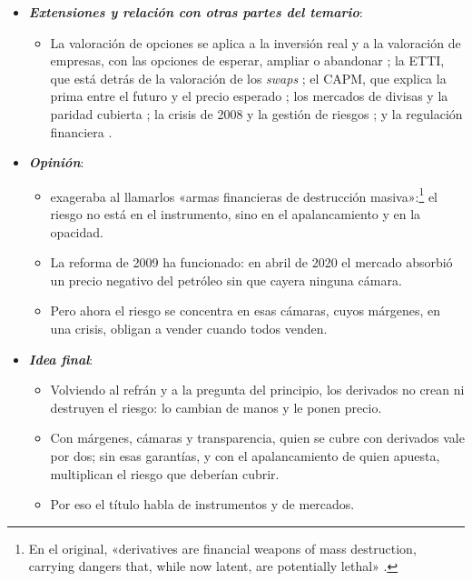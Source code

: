 \documentclass[11pt]{article}
\begin{document}
\begin{itemize}
\begin{itemize}
  \end{itemize}
\item \textbf{\emph{Extensiones y relación con otras partes del temario}}:
  \begin{itemize}
  \item La valoración de opciones se aplica a la inversión real y a la valoración de empresas, con las opciones de esperar, ampliar o abandonar   ; la ETTI, que está detrás de la valoración de los \emph{swaps} ; el CAPM, que explica la prima entre el futuro y el precio esperado ; los mercados de divisas y la paridad cubierta ; la crisis de 2008 y la gestión de riesgos ; y la regulación financiera .
  \end{itemize}
\item \textbf{\emph{Opinión}}:
  \begin{itemize}
  \item {} exageraba al llamarlos «armas financieras de destrucción masiva»:\footnote{En el original, «derivatives are financial weapons of mass destruction, carrying dangers that, while now latent, are potentially lethal» \parencite[15]{Buffett2003Carta}.} el riesgo no está en el instrumento, sino en el apalancamiento y en la opacidad.

  \item La reforma de 2009 ha funcionado: en abril de 2020 el mercado absorbió un precio negativo del petróleo sin que cayera ninguna cámara.

  \item Pero ahora el riesgo se concentra en esas cámaras, cuyos márgenes, en una crisis, obligan a vender cuando todos venden.
  \end{itemize}
\item \textbf{\emph{Idea final}}:
  \begin{itemize}
  \item Volviendo al refrán y a la pregunta del principio, los derivados no crean ni destruyen el riesgo: lo cambian de manos y le ponen precio.

  \item Con márgenes, cámaras y transparencia, quien se cubre con derivados vale por dos; sin esas garantías, y con el apalancamiento de quien apuesta, multiplican el riesgo que deberían cubrir.

  \item Por eso el título habla de instrumentos y de mercados.
  \end{itemize}
\end{itemize}
\end{document}
